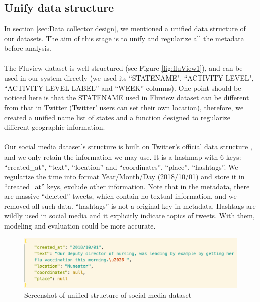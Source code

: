 \subsection{Unify data structure}
\label{sec:Unify data structure}
In section \ref{sec:Data collector design}, we mentioned a unified data structure of our datasets. The aim of this stage is to unify and regularize all the metadata before analysis. \\
\\The Fluview dataset is well structured (see Figure \ref{fig:fluView1}), and can be used in our system directly (we used its ``STATENAME", ``ACTIVITY LEVEL", ``ACTIVITY LEVEL LABEL'' and ``WEEK'' columns). One point should be noticed here is that the STATENAME used in Fluview dataset can be different from that in Twitter (Twitter' users can set their own location), therefore, we created a unified name list of states and a function designed to regularize different geographic information.\\
\\
Our social media dataset's structure is built on Twitter's official data structure \cite{twitter_dev}, and we only retain the information we may use. It is a hashmap with 6 keys: ``created\_at'', ``text'', ``location'' and ``coordinates'', ``place'', ``hashtags''. We regularize the time into format Year/Month/Day (2018/10/01) and store it in ``created\_at'' keys, exclude other information. Note that in the metadata, there are massive ``deleted'' tweets, which contain no textual information, and we removed all such data. ``hashtags'' is not a original key in metadata. Hashtags are wildly used in social media and it explicitly indicate topics of tweets. With them, modeling and evaluation could be more accurate. 
\begin{figure}[!bp]
    \centering
    \includegraphics[width=5in]{images/dataset1.png}
    \caption{Screenshot of unified structure of social media dataset}
    \label{fig:social_data_sture}
\end{figure}
